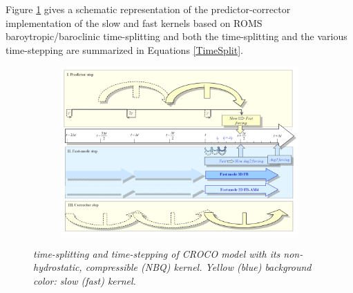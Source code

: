 Figure \ref{ModelTS} gives a schematic representation of the predictor-corrector implementation of the slow and fast kernels based on ROMS baroytropic/baroclinic time-splitting and both the time-splitting and the various time-stepping are summarized in Equations \ref{TimeSplit}.
\begin{figure}[!h]
	\centering		
	\begin{subfigure}{1.0\linewidth}
		\includegraphics[width=1\linewidth]{CHAP2/Model_TS.png}
		\caption{}
	\end{subfigure}
\caption{ \textit{time-splitting and time-stepping of CROCO model with its non-hydrostatic, compressible (NBQ) kernel. Yellow (blue) background color: slow (fast) kernel. }}
	\label{ModelTS}
\end{figure}
%
